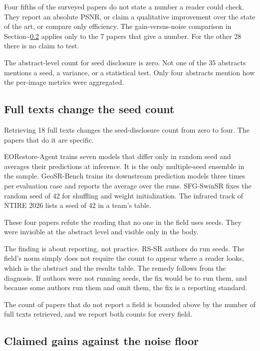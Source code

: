 \documentclass[pdflatex,sn-nature]{sn-jnl}
\begin{document}
Four fifths of the surveyed papers do not state a number a reader could check. They report an absolute PSNR, or claim a qualitative improvement over the state of the art, or compare only efficiency. The gain-versus-noise comparison in Section\textasciitilde{}\ref{sec:gains} applies only to the 7 papers that give a number. For the other 28 there is no claim to test.

The abstract-level count for seed disclosure is zero. Not one of the 35 abstracts mentions a seed, a variance, or a statistical test. Only four abstracts mention how the per-image metrics were aggregated.

\subsection{Full texts change the seed count}\label{sec:fulltext}

Retrieving 18 full texts changes the seed-disclosure count from zero to four. The papers that do it are specific.

EORestore-Agent \cite{ref9} trains seven models that differ only in random seed and averages their predictions at inference. It is the only multiple-seed ensemble in the sample. GeoSR-Bench \cite{ref3} trains its downstream prediction models three times per evaluation case and reports the average over the runs. SFG-SwinSR \cite{ref10} fixes the random seed of 42 for shuffling and weight initialization. The infrared track of NTIRE 2026 \cite{ref4} lists a seed of 42 in a team's table.

These four papers refute the reading that no one in the field uses seeds. They were invisible at the abstract level and visible only in the body.

The finding is about reporting, not practice. RS-SR authors do run seeds. The field's norm simply does not require the count to appear where a reader looks, which is the abstract and the results table. The remedy follows from the diagnosis. If authors were not running seeds, the fix would be to run them, and because some authors run them and omit them, the fix is a reporting standard.

The count of papers that do not report a field is bounded above by the number of full texts retrieved, and we report both counts for every field.

\subsection{Claimed gains against the noise floor}\label{sec:gains}
\end{document}
